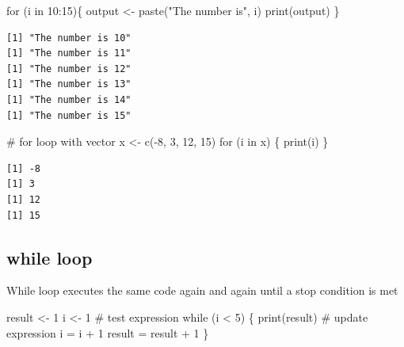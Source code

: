 \documentclass[
  letterpaper,
  DIV=11,
  numbers=noendperiod]{scrreprt}
\newenvironment{Shaded}{\begin{snugshade}}{\end{snugshade}}
\newcommand{\CommentTok}[1]{\textcolor[rgb]{0.37,0.37,0.37}{#1}}
\newcommand{\ControlFlowTok}[1]{\textcolor[rgb]{0.00,0.23,0.31}{#1}}
\newcommand{\DecValTok}[1]{\textcolor[rgb]{0.68,0.00,0.00}{#1}}
\newcommand{\FunctionTok}[1]{\textcolor[rgb]{0.28,0.35,0.67}{#1}}
\newcommand{\NormalTok}[1]{\textcolor[rgb]{0.00,0.23,0.31}{#1}}
\newcommand{\OtherTok}[1]{\textcolor[rgb]{0.00,0.23,0.31}{#1}}
\newcommand{\SpecialCharTok}[1]{\textcolor[rgb]{0.37,0.37,0.37}{#1}}
\newcommand{\StringTok}[1]{\textcolor[rgb]{0.13,0.47,0.30}{#1}}
\begin{document}
\begin{Shaded}
\begin{Highlighting}[]
\ControlFlowTok{for}\NormalTok{ (i }\ControlFlowTok{in} \DecValTok{10}\SpecialCharTok{:}\DecValTok{15}\NormalTok{)\{}
\NormalTok{        output }\OtherTok{\textless{}{-}} \FunctionTok{paste}\NormalTok{(}\StringTok{"The number is"}\NormalTok{, i)}
        \FunctionTok{print}\NormalTok{(output)}
\NormalTok{\}}
\end{Highlighting}
\end{Shaded}

\begin{verbatim}
[1] "The number is 10"
[1] "The number is 11"
[1] "The number is 12"
[1] "The number is 13"
[1] "The number is 14"
[1] "The number is 15"
\end{verbatim}

\begin{Shaded}
\begin{Highlighting}[]
\CommentTok{\# for loop with vector}
\NormalTok{x }\OtherTok{\textless{}{-}} \FunctionTok{c}\NormalTok{(}\SpecialCharTok{{-}}\DecValTok{8}\NormalTok{, }\DecValTok{3}\NormalTok{, }\DecValTok{12}\NormalTok{, }\DecValTok{15}\NormalTok{)}
\ControlFlowTok{for}\NormalTok{ (i }\ControlFlowTok{in}\NormalTok{ x)}
\NormalTok{\{}
    \FunctionTok{print}\NormalTok{(i)}
\NormalTok{\}}
\end{Highlighting}
\end{Shaded}

\begin{verbatim}
[1] -8
[1] 3
[1] 12
[1] 15
\end{verbatim}

\hypertarget{while-loop}{%
\subsection{while loop}\label{while-loop}}

While loop executes the same code again and again until a stop condition
is met

\begin{Shaded}
\begin{Highlighting}[]
\NormalTok{result }\OtherTok{\textless{}{-}} \DecValTok{1}
\NormalTok{i }\OtherTok{\textless{}{-}} \DecValTok{1}
\CommentTok{\# test expression}
\ControlFlowTok{while}\NormalTok{ (i }\SpecialCharTok{\textless{}} \DecValTok{5}\NormalTok{) \{}
    \FunctionTok{print}\NormalTok{(result)}
\CommentTok{\# update expression}
\NormalTok{   i }\OtherTok{=}\NormalTok{ i }\SpecialCharTok{+} \DecValTok{1}
\NormalTok{   result }\OtherTok{=}\NormalTok{ result }\SpecialCharTok{+} \DecValTok{1}
\NormalTok{\}}
\end{Highlighting}
\end{Shaded}
\end{document}
